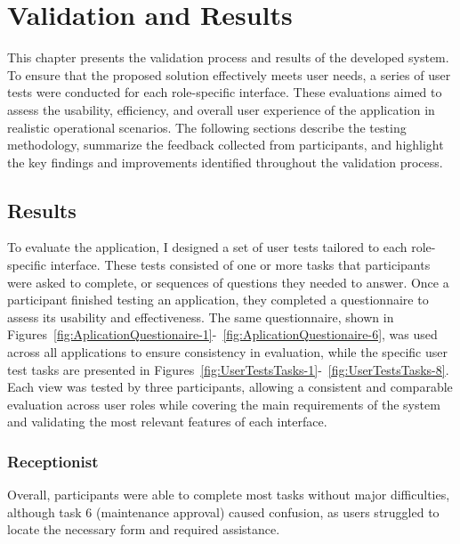 \chapter{Validation and Results}%
\label{chapter:ValidationandResults}

\begin{introduction}
This chapter presents the validation process and results of the developed system. To ensure that the proposed solution effectively meets user needs, a series of user tests were conducted for each role-specific interface. These evaluations aimed to assess the usability, efficiency, and overall user experience of the application in realistic operational scenarios.
The following sections describe the testing methodology, summarize the feedback collected from participants, and highlight the key findings and improvements identified throughout the validation process.
\end{introduction} 


\section{Results}


To evaluate the application, I designed a set of user tests tailored to each role-specific interface. These tests consisted of one or more tasks that participants were asked to complete, or sequences of questions they needed to answer. Once a participant finished testing an application, they completed a questionnaire to assess its usability and effectiveness. The same questionnaire, shown in Figures~\ref{fig:AplicationQuestionaire-1}-~\ref{fig:AplicationQuestionaire-6}, was used across all applications to ensure consistency in evaluation, while the specific user test tasks are presented in Figures~\ref{fig:UserTestsTasks-1}-~\ref{fig:UserTestsTasks-8}. Each view was tested by three participants, allowing a consistent and comparable evaluation across user roles while covering the main requirements of the system and validating the most relevant features of each interface.

\subsection{Receptionist}
Overall, participants were able to complete most tasks without major difficulties, although task 6 (maintenance approval) caused confusion, as users struggled to locate the necessary form and required assistance.

